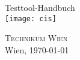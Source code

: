 %
%

\begin{titlepage}
\begin{center}
\vspace*{40mm} \huge Testtool-Handbuch\\
\vspace*{10mm}
\vfill \texttt{[image: cis]}
	
\large \vfill \textsc{Technikum Wien}\\

Wien, \today
\end{center}
\end{titlepage}

